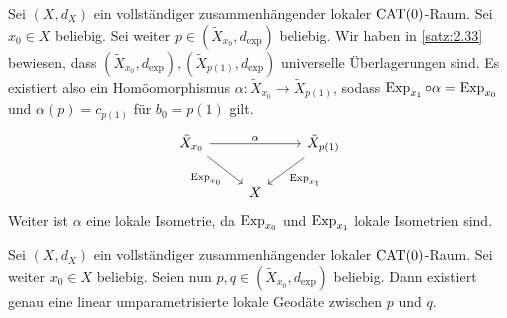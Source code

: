 \begin{bemerkung}
\label{bem:2.37}
	Sei $(X,d_X)$ ein vollständiger zusammenhängender lokaler $\operatorname{CAT(0)}$-Raum.
	Sei $x_0 \in X$ beliebig.
	Sei weiter $p \in (\tilde{X}_{x_0},d_{\exp})$ beliebig.
	Wir haben in \autoref{satz:2.33} bewiesen, dass $(\tilde{X}_{x_0},d_{\exp}), (\tilde{X}_{p(1)},d_{\exp})$ universelle Überlagerungen sind.
	Es existiert also ein Homöomorphismus $\alpha \colon \tilde{X}_{x_0} \rightarrow \tilde{X}_{p(1)}$, sodass $\operatorname{Exp}_{x_1} \circ \alpha = \operatorname{Exp}_{x_0}$ und $\alpha(p) = c_{p(1)}$ für $b_0 = p(1)$ gilt.
	\[
		\begin{tikzcd}
			\tilde{X}_{x_0} \arrow{rr}{\alpha} \arrow{rd}[swap]{\Exp_{x_0}} & & \tilde{X}_{p(1)} \arrow{ld}{\Exp_{x_1}} \\
			& X & 
		\end{tikzcd}
	\]	
	Weiter ist $\alpha$ eine lokale Isometrie, da $\operatorname{Exp}_{x_0}$ und $\operatorname{Exp}_{x_1}$ lokale Isometrien sind.
\end{bemerkung}

\begin{lemma}
\label{lemma:2.38}
	Sei $(X,d_X)$ ein vollständiger zusammenhängender lokaler $\operatorname{CAT(0)}$-Raum.
	Sei weiter $x_0 \in X$ beliebig.
	Seien nun $p,q \in (\tilde{X}_{x_0},d_{\exp})$ beliebig.
	Dann existiert genau eine linear umparametrisierte lokale Geodäte zwischen $p$ und $q$.
\end{lemma}

